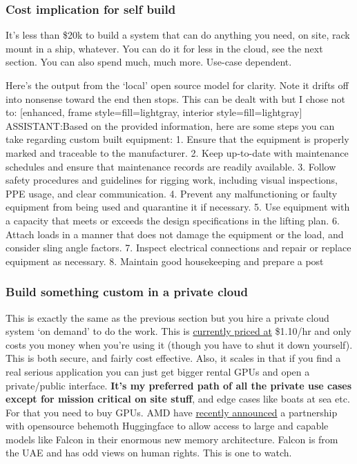 \subsubsection{Cost implication for self build}
It's less than \$20k to build a system that can do anything you need, on site, rack mount in a ship, whatever. You can do it for less in the cloud, see the next section. You can also spend much, much more. Use-case dependent.\par
Here's the output from the `local' open source model for clarity. Note it drifts off into nonsense toward the end then stops. This can be dealt with but I chose not to:
[enhanced, frame style={fill=lightgray}, interior style={fill=lightgray}]
ASSISTANT:Based on the provided information, here are some steps you can take regarding custom built equipment: 
1. Ensure that the equipment is properly marked and traceable to the manufacturer. 
2. Keep up-to-date with maintenance schedules and ensure that maintenance records are readily available. 
3. Follow safety procedures and guidelines for rigging work, including visual inspections, PPE usage, and clear communication. 
4. Prevent any malfunctioning or faulty equipment from being used and quarantine it if necessary. 
5. Use equipment with a capacity that meets or exceeds the design specifications in the lifting plan. 
6. Attach loads in a manner that does not damage the equipment or the load, and consider sling angle factors. 
7. Inspect electrical connections and repair or replace equipment as necessary. 
8. Maintain good housekeeping and prepare a post

\subsubsection{Build something custom in a private cloud}
This is exactly the same as the previous section but you hire a private cloud system `on demand' to do the work. This is \href{https://lambdalabs.com/service/gpu-cloud/pricing}{currently priced at} \$1.10/hr and only costs you money when you're using it (though you have to shut it down yourself). This is both secure, and fairly cost effective. Also, it scales in that if you find a real serious application you can just get bigger rental GPUs and open a private/public interface. \textbf{It's my preferred path of all the private use cases except for mission critical on site stuff}, and edge cases like boats at sea etc. For that you need to buy GPUs. AMD have \href{https://www.amd.com/en/newsroom/press-releases/2023-6-13-amd-expands-leadership-data-center-portfolio-with-.html}{recently announced} a partnership with opensource behemoth Huggingface to allow access to large and capable models like Falcon in their enormous new memory architecture. Falcon is from the UAE and has odd views on human rights. This is one to watch.
